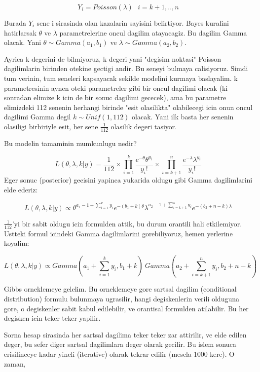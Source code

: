 \documentclass[12pt,fleqn]{article}\usepackage{../common}
\begin{document}
\[ Y_i = Poisson(\lambda) \ \ \ i=k+1,..,n \]

Burada $Y_i$ sene i sirasinda olan kazalarin sayisini belirtiyor. Bayes kuralini
hatirlarsak $\theta$ ve $\lambda$ parametrelerine oncul dagilim atayacagiz. Bu
dagilim Gamma olacak. Yani $\theta \sim Gamma(a_1, b_1)$ ve $\lambda \sim
Gamma(a_2, b_2)$.

Ayrica k degerini de bilmiyoruz, k degeri yani "degisim noktasi" Poisson
dagilimlarin birinden otekine gectigi andir. Bu seneyi bulmaya
calisiyoruz. Simdi tum verinin, tum seneleri kapsayacak sekilde modelini kurmaya
baslayalim. k parametresinin aynen oteki parametreler gibi bir oncul dagilimi
olacak (ki sonradan elimize k icin de bir sonuc dagilimi gececek), ama bu
parametre elimizdeki 112 senenin herhangi birinde "esit olasilikta" olabilecegi
icin onun oncul dagilimi Gamma degil $k \sim Unif(1,112)$ olacak. Yani ilk basta
her senenin olasiligi birbiriyle esit, her sene $\frac{1}{112}$ olasilik degeri
tasiyor.

Bu modelin tamaminin mumkunlugu nedir?

\[ L(\theta, \lambda, k | y) = \frac{1}{112} \times \displaystyle \prod_{i=1}^k
\frac{e^{-\theta}\theta^{y_i}}{y_i!}  \times \displaystyle \prod_{i=k+1}^n
\frac{e^{-\lambda}\lambda^{y_i}}{y_i!} 
 \]
Eger sonuc (posterior) gecisini yapinca yukarida oldugu gibi Gamma dagilimlarini
elde ederiz:

\[ L(\theta, \lambda, k | y)  \propto 
\theta^{a_1-1+\sum_{i=1}^{k} y_i}e^{-(b_1+k)\theta} 
\lambda^{a_2-1+\sum_{i=k+1}^n y_i}e^{-(b_2+n-k)\lambda} 
 \]

$\frac{1}{112}$'yi bir sabit oldugu icin formulden attik, bu durum orantili hali
etkilemiyor. Ustteki formul icindeki Gamma dagilimlarini gorebiliyoruz, hemen
yerlerine koyalim:

\[ L(\theta, \lambda, k | y)  \propto 
Gamma(a_1 + \sum_{i=1}^{k} y_i, b_1+k) \
Gamma(a_2 + \sum_{i=k+1}^{n} y_i, b_2+n-k)
 \]

Gibbs orneklemeye gelelim. Bu orneklemeye gore sartsal dagilim (conditional
distribution) formulu bulunmaya ugrasilir, hangi degiskenlerin verili olduguna
gore, o degiskenler sabit kabul edilebilir, ve orantisal formulden
atilabilir. Bu her degisken icin teker teker yapilir. 

Sorna hesap sirasinda her sartsal dagilima teker teker zar attirilir, ve elde
edilen deger, bu sefer diger sartsal dagilimlara deger olarak gecilir. Bu islem
sonuca erisilinceye kadar yineli (iterative) olarak tekrar edilir (mesela 1000
kere). O zaman,
\end{document}
